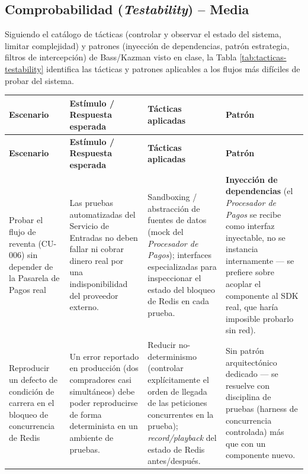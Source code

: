 \documentclass[12pt,a4paper]{article}
\begin{document}
\subsection{Comprobabilidad (\textit{Testability}) -- Media}

Siguiendo el catálogo de tácticas (controlar y observar el estado del sistema, limitar
complejidad) y patrones (inyección de dependencias, patrón estrategia, filtros de intercepción)
de Bass/Kazman visto en clase, la Tabla \ref{tab:tacticas-testability} identifica las tácticas y
patrones aplicables a los flujos más difíciles de probar del sistema.

\begin{center}
\begin{longtable}{p{2.6cm}p{4.7cm}p{3.6cm}p{2.9cm}}
\toprule
\textbf{Escenario} & \textbf{Estímulo / Respuesta esperada} & \textbf{Tácticas aplicadas} & \textbf{Patrón}\\
\midrule
\endfirsthead
\toprule
\textbf{Escenario} & \textbf{Estímulo / Respuesta esperada} & \textbf{Tácticas aplicadas} & \textbf{Patrón}\\
\midrule
\endhead
Probar el flujo de reventa (CU-006) sin depender de la Pasarela de Pagos real &
Las pruebas automatizadas del Servicio de Entradas no deben fallar ni cobrar dinero real por una
indisponibilidad del proveedor externo. &
Sandboxing / abstracción de fuentes de datos (mock del \textit{Procesador de Pagos}); interfaces
especializadas para inspeccionar el estado del bloqueo de Redis en cada prueba. &
\textbf{Inyección de dependencias} (el \textit{Procesador de Pagos} se recibe como interfaz
inyectable, no se instancia internamente — se prefiere sobre acoplar el componente al SDK real,
que haría imposible probarlo sin red).\\[0.5em]

Reproducir un defecto de condición de carrera en el bloqueo de concurrencia de Redis &
Un error reportado en producción (dos compradores casi simultáneos) debe poder reproducirse de
forma determinista en un ambiente de pruebas. &
Reducir no-determinismo (controlar explícitamente el orden de llegada de las peticiones
concurrentes en la prueba); \textit{record/playback} del estado de Redis antes/después. &
Sin patrón arquitectónico dedicado — se resuelve con disciplina de pruebas (harness de
concurrencia controlada) más que con un componente nuevo.\\[0.5em]


\end{longtable}
\end{center}
\end{document}
